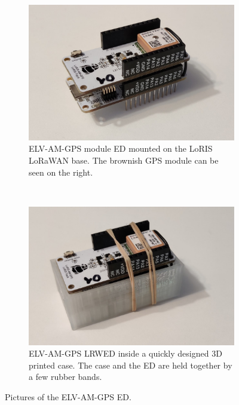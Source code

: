 \begin{figure}
    \centering

    \begin{subfigure}[t]{0.5\textwidth}
        \centering
        \includegraphics[width=1\textwidth]{pictures/hardware/gps-nodes/loris_bare.jpg}
        \caption{
            ELV-AM-GPS module \acl{ED} mounted on the LoRIS \ac{LoRaWAN} base.
            The brownish \ac{GPS} module can be seen on the right.
        }\label{pic:loris-node-bare}
    \end{subfigure}%
    ~
    \begin{subfigure}[t]{0.5\textwidth}
        \centering
        \includegraphics[width=1\textwidth]{pictures/hardware/gps-nodes/loris_with_case.jpg}
        \caption{
            ELV-AM-GPS \acl{LRWED} inside a quickly designed 3D printed case.
            The case and the \acl{ED} are held together by a few rubber bands.
        }\label{pic:loris-node-with-case}
    \end{subfigure}

    \caption{Pictures of the ELV-AM-GPS \acl{ED}.}
\end{figure}

